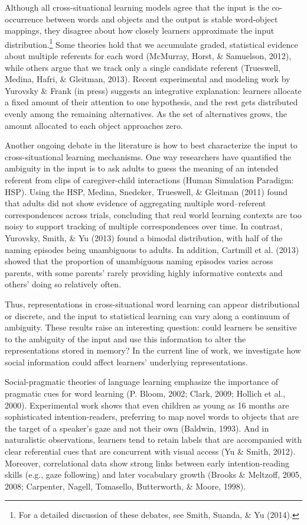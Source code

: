 \documentclass[a4paper,man,natbib]{apa6}
\begin{document}
Although all cross-situational learning models agree that the input is
the co-occurrence between words and objects and the output is stable
word-object mappings, they disagree about how closely learners
approximate the input distribution.\footnote{For a detailed discussion
  of these debates, see Smith, Suanda, \& Yu (2014).} Some theories hold
that we accumulate graded, statistical evidence about multiple referents
for each word (McMurray, Horst, \& Samuelson, 2012), while others argue
that we track only a single candidate referent (Trueswell, Medina,
Hafri, \& Gleitman, 2013). Recent experimental and modeling work by
Yurovsky \& Frank (in press) suggests an integrative explanation:
learners allocate a fixed amount of their attention to one hypothesis,
and the rest gets distributed evenly among the remaining alternatives.
As the set of alternatives grows, the amount allocated to each object
approaches zero.

Another ongoing debate in the literature is how to best characterize the
input to cross-situational learning mechanisms. One way researchers have
quantified the ambiguity in the input is to ask adults to guess the
meaning of an intended referent from clips of caregiver-child
interactions (Human Simulation Paradigm: HSP). Using the HSP, Medina,
Snedeker, Trueswell, \& Gleitman (2011) found that adults did not show
evidence of aggregating multiple word--referent correspondences across
trials, concluding that real world learning contexts are too noisy to
support tracking of multiple correspondences over time. In contrast,
Yurovsky, Smith, \& Yu (2013) found a bimodal distribution, with half of
the naming episodes being unambiguous to adults. In addition, Cartmill
et al. (2013) showed that the proportion of unambiguous naming episodes
varies across parents, with some parents' rarely providing highly
informative contexts and others' doing so relatively often.

Thus, representations in cross-situational word learning can appear
distributional or discrete, and the input to statistical learning can
vary along a continuum of ambiguity. These results raise an interesting
question: could learners be sensitive to the ambiguity of the input and
use this information to alter the representations stored in memory? In
the current line of work, we investigate how social information could
affect learners' underlying representations.

Social-pragmatic theories of language learning emphasize the importance
of pragmatic cues for word learning (P. Bloom, 2002; Clark, 2009;
Hollich et al., 2000). Experimental work shows that even children as
young as 16 months are sophisticated intention-readers, preferring to
map novel words to objects that are the target of a speaker's gaze and
not their own (Baldwin, 1993). And in naturalistic observations,
learners tend to retain labels that are accompanied with clear
referential cues that are concurrent with visual access (Yu \& Smith,
2012). Moreover, correlational data show strong links between early
intention-reading skills (e.g., gaze following) and later vocabulary
growth (Brooks \& Meltzoff, 2005, 2008; Carpenter, Nagell, Tomasello,
Butterworth, \& Moore, 1998).
\end{document}
